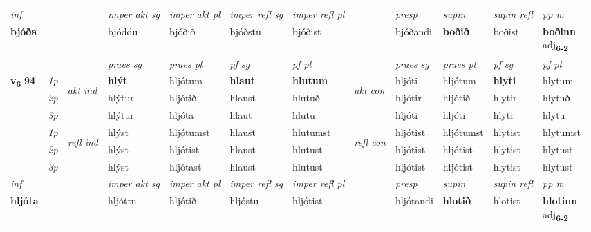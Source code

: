 \begin{longtable}[l]{X>{\footnotesize\itshape}llXXXXlXXXX}
\cmidrule{4-7}
   {\textit{inf}} & &  & \textit{imper akt sg} & \textit{imper akt pl} & \textit{imper refl sg} & \textit{imper refl pl} && \textit{presp} & \textit{supin} & \textit{supin refl} & \textit{pp m} \\*
  {\textbf{bjóða}} & && bjóddu  & bjóðið & bjóðstu & bjóðist && bjóðandi &  \textbf{boðið} & boðist & \specialcell{\textbf{boðinn} \\ adj\textbf{\textsubscript{6-2}}} \\*

\midrule

 & &   & \textit{praes sg}  & \textit{praes pl}    & \textit{ pf sg} & \textit{pf pl} & & \textit{praes sg}  & \textit{praes pl}    & \textit{pf sg} & \textit{pf pl }  \\ \cmidrule{4-7} \cmidrule{9-12}
 \multirow{2}{*}{{{\textbf{v{\textsubscript{6}}} \Large{\textbf{94}}}}}  & 1p & \multirow{3}{*}{\begin{turn}{90}\textit{akt ind}\end{turn}} & \textbf{hlýt} & hljótum & \textbf{hlaut} & \textbf{hlutum} & \multirow{3}{*}{\begin{turn}{90}\textit{akt con}\end{turn}} &hljóti & hljótum & \textbf{hlyti} & hlytum\\*
 & 2p &  &  hlýtur  & hljótið & hlaust & hlutuð & & hljótir & hljótið & hlytir & hlytuð \\*
 & 3p &  & hlýtur & hljóta & hlaut & hlutu & & hljóti & hljóti& hlyti & hlytu \\*
\cmidrule{4-7} \cmidrule{9-12}
 & 1p & \multirow{3}{*}{\begin{turn}{90}\textit{refl ind}\end{turn}}  & hlýst & hljótumst & hlaust & hlutumst & \multirow{3}{*}{\begin{turn}{90}\textit{refl con}\end{turn}}  &hljótist & hljótumst & hlytist & hlytumst \\*
 & 2p &  & hlýst & hljótist & hlaust & hlutust & &hljótist & hljótist & hlytist & hlytust \\*
 & 3p  & & hlýst & hljótast & hlaust & hlutust & & hljótist & hljótist& hlytist & hlytust \\*
\cmidrule{4-7} \cmidrule{9-12}

   {\textit{inf}} & &  & \textit{imper akt sg} & \textit{imper akt pl} & \textit{imper refl sg} & \textit{imper refl pl} && \textit{presp} & \textit{supin} & \textit{supin refl} & \textit{pp m} \\*
  {\textbf{hljóta}} & && hljóttu  & hljótið & hljóstu & hljótist && hljótandi &  \textbf{hlotið} & hlotist & \specialcell{\textbf{hlotinn} \\ adj\textbf{\textsubscript{6-2}}} \\*


\end{longtable}
